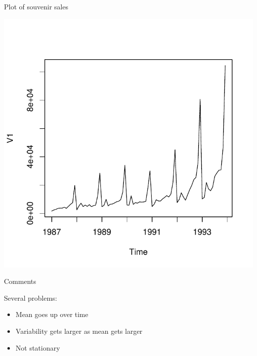 \begin{frame}[fragile]{Plot of souvenir sales}
  
\begin{knitrout}
\color{fgcolor}\begin{kframe}
\begin{alltt}
\end{alltt}
\end{kframe}
\includegraphics[width=\maxwidth]{figure/fiorentina-1} 

\end{knitrout}
  
\end{frame}

\begin{frame}[fragile]{Comments}

Several problems:

\begin{itemize}
\item Mean goes up over time
\item Variability gets larger as mean gets larger
\item Not stationary
\end{itemize}
  
\end{frame}

